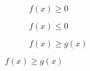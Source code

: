 \begin{figure}[H]
  \centering
  
  \begin{subfigure}[b]{0.3\textwidth}
    
    \caption{\(f(x) \ge 0\)}\label{fig:int-square-1}

  \end{subfigure}
  \qquad
  \begin{subfigure}[b]{0.3\textwidth}

    
    \caption{\(f(x) \le 0\)}\label{fig:int-square-2}

  \end{subfigure}
  \qquad
  \begin{subfigure}[b]{0.3\textwidth}

    
    \caption{\(f(x) \ge g(x)\)}\label{fig:int-square-3}

  \end{subfigure}
\end{figure}
